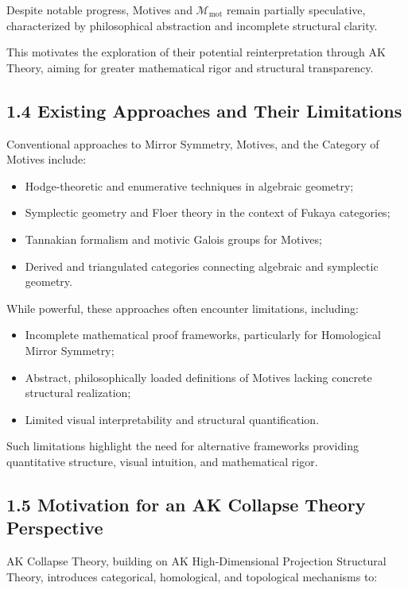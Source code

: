 \documentclass[11pt]{article}
\begin{document}
Despite notable progress, Motives and $\mathcal{M}_{\mathrm{mot}}$ remain partially speculative, characterized by philosophical abstraction and incomplete structural clarity.

This motivates the exploration of their potential reinterpretation through AK Theory, aiming for greater mathematical rigor and structural transparency.

\subsection{1.4 Existing Approaches and Their Limitations}

Conventional approaches to Mirror Symmetry, Motives, and the Category of Motives include:

\begin{itemize}
    \item Hodge-theoretic and enumerative techniques in algebraic geometry;
    \item Symplectic geometry and Floer theory in the context of Fukaya categories;
    \item Tannakian formalism and motivic Galois groups for Motives;
    \item Derived and triangulated categories connecting algebraic and symplectic geometry.
\end{itemize}

While powerful, these approaches often encounter limitations, including:

\begin{itemize}
    \item Incomplete mathematical proof frameworks, particularly for Homological Mirror Symmetry;
    \item Abstract, philosophically loaded definitions of Motives lacking concrete structural realization;
    \item Limited visual interpretability and structural quantification.
\end{itemize}

Such limitations highlight the need for alternative frameworks providing quantitative structure, visual intuition, and mathematical rigor.

\subsection{1.5 Motivation for an AK Collapse Theory Perspective}

AK Collapse Theory, building on AK High-Dimensional Projection Structural Theory, introduces categorical, homological, and topological mechanisms to:
\end{document}
